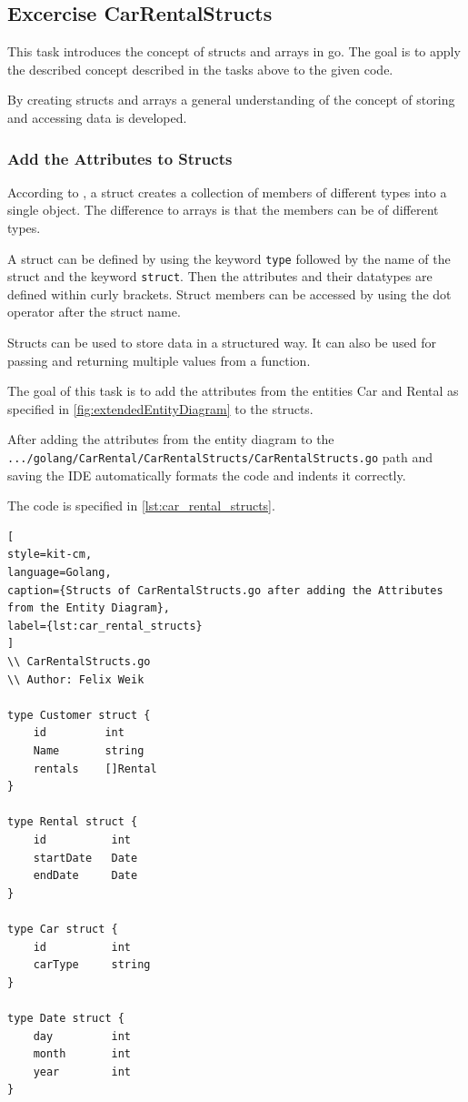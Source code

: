 \subsection{Excercise CarRentalStructs}
\label{sec:car_rental_structs}
This task introduces the concept of structs and arrays in go.
The goal is to apply the described concept described in the tasks above to the given code.

By creating structs and arrays a general understanding of the concept of storing and accessing data is developed.

\subsubsection*{Add the Attributes to Structs}
According to \cite{W3S-STR}, a struct creates a collection of members of different types into a single object.
The difference to arrays is that the members can be of different types.

A struct can be defined by using the keyword \texttt{type} followed by the name of the struct and the keyword \texttt{struct}.
Then the attributes and their datatypes are defined within curly brackets.
Struct members can be accessed by using the dot operator after the struct name.

Structs can be used to store data in a structured way.
It can also be used for passing and returning multiple values from a function.

The goal of this task is to add the attributes from the entities Car and Rental as specified in \autoref{fig:extendedEntityDiagram} to the structs.

After adding the attributes from the entity diagram to the \hfill \newline \texttt{.../golang/CarRental/CarRentalStructs/CarRentalStructs.go} path and saving
the IDE automatically formats the code and indents it correctly.

The code is specified in \autoref{lst:car_rental_structs}.
\begin{lstlisting}[
style=kit-cm,
language=Golang,
caption={Structs of CarRentalStructs.go after adding the Attributes from the Entity Diagram},
label={lst:car_rental_structs}
]
\\ CarRentalStructs.go
\\ Author: Felix Weik

type Customer struct {
	id         int
	Name       string
	rentals    []Rental
}

type Rental struct {
	id          int
	startDate   Date
    endDate     Date
}

type Car struct {
    id          int
    carType     string
}

type Date struct {
    day         int 
    month       int 
    year        int 
}
\end{lstlisting}

